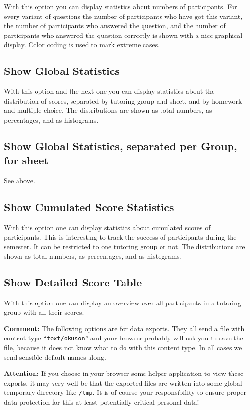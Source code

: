 \documentclass[12pt,openany,a4paper]{book}
\begin{document}
With this option you can display statistics about numbers of participants.
For every variant of questions the number of participants who have
got this variant, the number of participants who answered the question, and
the number of participants who answered the question correctly is shown
with a nice graphical display. Color coding is used to mark extreme
cases.

\subsection{Show Global Statistics}

With this option and the next one you can display statistics about the
distribution of scores, separated by tutoring group and sheet, and by
homework and multiple choice. The distributions are shown as total numbers, 
as percentages, and as histograms.

\subsection{Show Global Statistics, separated per Group, for sheet}

See above.

\subsection{Show Cumulated Score Statistics}

With this option one can display statistics about cumulated scores of
participants. This is interesting to track the success of participants
during the semester. It can be restricted to one tutoring group or not.
The distributions are shown as total numbers, 
as percentages, and as histograms.

\subsection{Show Detailed Score Table}

With this option one can display an overview over all participants in
a tutoring group with all their scores.


\bigskip
\textbf{Comment:} 
The following options are for data exports. They all send a file with
content type ``\texttt{text/okuson}'' and your browser probably will
ask you to save the file, because it does not know what to do with this
content type. In all cases we send sensible default names along. 

\textbf{Attention:} If you choose in your browser some helper application
to view these exports, it may very well be that the exported files are
written into some global temporary directory like \texttt{/tmp}. It is
of course your responsibility to ensure proper data protection for this
at least potentially critical personal data!
\end{document}
